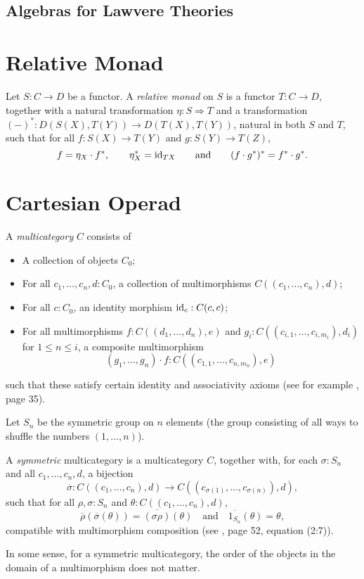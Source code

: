 \subsection{Algebras for Lawvere Theories}

\section{Relative Monad}
\begin{definition}
  Let $ S: C \to D $ be a functor. A \textit{relative monad} on $ S $ is a functor $ T: C \to D $, together with a natural transformation $ \eta: S \Rightarrow T $ and a transformation $ (-)^*: D(S(X), T(Y)) \to D(T(X), T(Y)) $, natural in both $ S $ and $ T $, such that for all $ f: S(X) \to T(Y) $ and $ g: S(Y) \to T(Z) $,
  \[ f = \eta_X \cdot f^*, \qquad \eta_X^* = \text{id}_{T X} \qquad \text{and} \qquad (f \cdot g^*)^* = f^* \cdot g^*. \]
\end{definition}

\section{Cartesian Operad}
\begin{definition}[multicategory]
  A \textit{multicategory} $ C $ consists of
  \begin{itemize}
    \item A collection of objects $ C_0 $;
    \item For all $ c_1, \dots, c_n, d: C_0 $, a collection of multimorphisms $ C((c_1, \dots, c_n), d) $;
    \item For all $ c: C_0 $, an identity morphism $ \text{id}_{c} : C(c, c) $;
    \item For all multimorphisms $ f: C((d_1, \dots, d_n), e) $ and $ g_i: C((c_{i,1}, \dots, c_{i,m_i}), d_i) $ for $ 1 \leq n \leq i $, a composite multimorphism
    \[ (g_1, \dots, g_n) \cdot f: C((c_{1,1}, \dots, c_{n, m_n}), e) \]
  \end{itemize}
  such that these satisfy certain identity and associativity axioms (see for example \cite{higher-operads}, page 35).
\end{definition}

Let $ S_n $ be the symmetric group on $ n $ elements (the group consisting of all ways to shuffle the numbers $ (1, \dots, n) $).

\begin{definition}
  A \textit{symmetric} multicategory is a multicategory $ C $, together with, for each $ \sigma: S_n $ and all $ c_1, \dots, c_n, d $, a bijection
  \[ \overline \sigma: C((c_1, \dots, c_n), d) \to C((c_{\sigma(1)}, \dots, c_{\sigma(n)}), d), \]
  such that for all $ \rho, \sigma: S_n $ and $ \theta: C((c_1, \dots, c_n), d) $,
  \[ \overline \rho(\overline \sigma(\theta)) = \overline{(\sigma \rho)}(\theta) \quad \text{and} \quad \overline {1_{S_n}}(\theta) = \theta, \]
  compatible with multimorphism composition (see \cite{higher-operads}, page 52, equation (2:7)).
\end{definition}
In some sense, for a symmetric multicategory, the order of the objects in the domain of a multimorphism does not matter.


